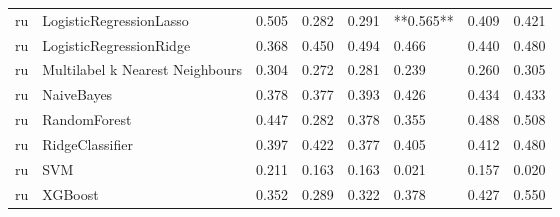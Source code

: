 \begin{tabular}{llllllll}
      ru &         LogisticRegressionLasso & 0.505 &                     0.282 &                 0.291 &              **0.565** &                                   0.409 &     0.421 \\
      ru &         LogisticRegressionRidge & 0.368 &                     0.450 &                 0.494 &                  0.466 &                                   0.440 &     0.480 \\
      ru & Multilabel k Nearest Neighbours & 0.304 &                     0.272 &                 0.281 &                  0.239 &                                   0.260 &     0.305 \\
      ru &                      NaiveBayes & 0.378 &                     0.377 &                 0.393 &                  0.426 &                                   0.434 &     0.433 \\
      ru &                    RandomForest & 0.447 &                     0.282 &                 0.378 &                  0.355 &                                   0.488 &     0.508 \\
      ru &                 RidgeClassifier & 0.397 &                     0.422 &                 0.377 &                  0.405 &                                   0.412 &     0.480 \\
      ru &                             SVM & 0.211 &                     0.163 &                 0.163 &                  0.021 &                                   0.157 &     0.020 \\
      ru &                         XGBoost & 0.352 &                     0.289 &                 0.322 &                  0.378 &                                   0.427 &     0.550 \\
\bottomrule
\end{tabular}

